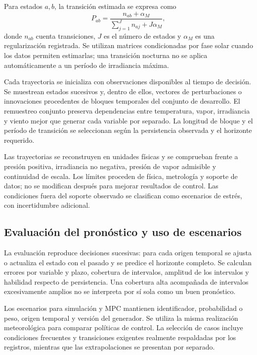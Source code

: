 Para estados $a,b$, la transición estimada se expresa como
\begin{equation}
\widehat P_{ab}=
\frac{n_{ab}+\alpha_M}
{\sum_{j=1}^{J}n_{aj}+J\alpha_M},
\label{met:transicion_markov}
\end{equation}
donde $n_{ab}$ cuenta transiciones, $J$ es el número de estados y $\alpha_M$ es una regularización registrada. Se utilizan matrices condicionadas por fase solar cuando los datos permiten estimarlas; una transición nocturna no se aplica automáticamente a un período de irradiancia máxima.

Cada trayectoria se inicializa con observaciones disponibles al tiempo de decisión. Se muestrean estados sucesivos y, dentro de ellos, vectores de perturbaciones o innovaciones procedentes de bloques temporales del conjunto de desarrollo. El remuestreo conjunto preserva dependencias entre temperatura, vapor, irradiancia y viento mejor que generar cada variable por separado. La longitud de bloque y el período de transición se seleccionan según la persistencia observada y el horizonte requerido.

Las trayectorias se reconstruyen en unidades físicas y se comprueban frente a presión positiva, irradiancia no negativa, presión de vapor admisible y continuidad de escala. Los límites proceden de física, metrología y soporte de datos; no se modifican después para mejorar resultados de control. Las condiciones fuera del soporte observado se clasifican como escenarios de estrés, con incertidumbre adicional.

\subsection{Evaluación del pronóstico y uso de escenarios}

La evaluación reproduce decisiones sucesivas: para cada origen temporal se ajusta o actualiza el estado con el pasado y se predice el horizonte completo. Se calculan errores por variable y plazo, cobertura de intervalos, amplitud de los intervalos y habilidad respecto de persistencia. Una cobertura alta acompañada de intervalos excesivamente amplios no se interpreta por sí sola como un buen pronóstico.

Los escenarios para simulación y MPC mantienen identificador, probabilidad o peso, origen temporal y versión del generador. Se utiliza la misma realización meteorológica para comparar políticas de control. La selección de casos incluye condiciones frecuentes y transiciones exigentes realmente respaldadas por los registros, mientras que las extrapolaciones se presentan por separado.

